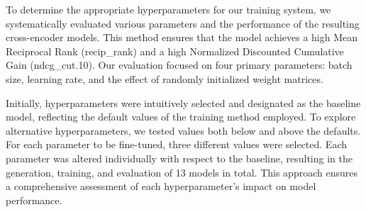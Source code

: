 To determine the appropriate hyperparameters for our training system, we systematically evaluated various parameters and the performance of the resulting cross-encoder models. This method ensures that the model achieves a high Mean Reciprocal Rank (recip\_rank) and a high Normalized Discounted Cumulative Gain (ndcg\_cut.10). Our evaluation focused on four primary parameters: batch size, learning rate, and the effect of randomly initialized weight matrices.

Initially, hyperparameters were intuitively selected and designated as the baseline model, reflecting the default values of the training method employed. To explore alternative hyperparameters, we tested values both below and above the defaults. For each parameter to be fine-tuned, three different values were selected. Each parameter was altered individually with respect to the baseline, resulting in the generation, training, and evaluation of 13 models in total. This approach ensures a comprehensive assessment of each hyperparameter's impact on model performance.

